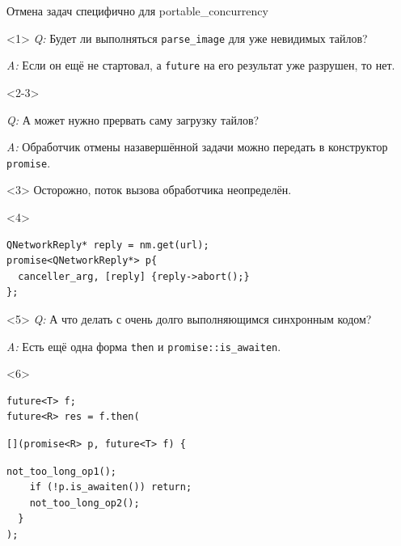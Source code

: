 \documentclass[aspectratio=169,hyperref={unicode},17pt]{beamer}
\begin{document}
\begin{frame}[fragile,t]{Отмена задач {\footnotesize{специфично для portable\_concurrency}}}
\begin{onlyenv}<1>
{\em Q:} Будет ли выполняться \texttt{parse\_image} для уже невидимых тайлов?

{\em A:} Если он ещё не стартовал, а \texttt{future} на его результат уже разрушен, то нет.
\end{onlyenv}
\begin{onlyenv}<2-3>

{\em Q:} А может нужно прервать саму загрузку тайлов?

{\em A:} Обработчик отмены назавершённой задачи можно передать в конструктор \texttt{promise}.\\
\begin{onlyenv}<3>
\footnotesize{Осторожно, поток вызова обработчика неопределён.}
\end{onlyenv}
\end{onlyenv}
\begin{onlyenv}<4>
\begin{lstlisting}[style=cppcode]
QNetworkReply* reply = nm.get(url);
promise<QNetworkReply*> p{
  canceller_arg, [reply] {reply->abort();}
};
\end{lstlisting}
\end{onlyenv}
\begin{onlyenv}<5>
{\em Q:} А что делать с очень долго выполняющимся синхронным кодом?

{\em A:} Есть ещё одна форма \texttt{then} и \texttt{promise::is\_awaiten}.
\end{onlyenv}
\begin{onlyenv}<6>
\begin{lstlisting}[style=cppcode,belowskip=0pt]
future<T> f;
future<R> res = f.then(
\end{lstlisting}
\begin{lstlisting}[style=cppcode,backgroundcolor=\color{gray!30},aboveskip=0pt,belowskip=0pt]
  [](promise<R> p, future<T> f) {
\end{lstlisting}
\begin{lstlisting}[style=cppcode,aboveskip=0pt,belowskip=0pt]
    not_too_long_op1();
    if (!p.is_awaiten()) return;
    not_too_long_op2();
  }
);
\end{lstlisting}
\end{onlyenv}
\end{frame}
\end{document}
